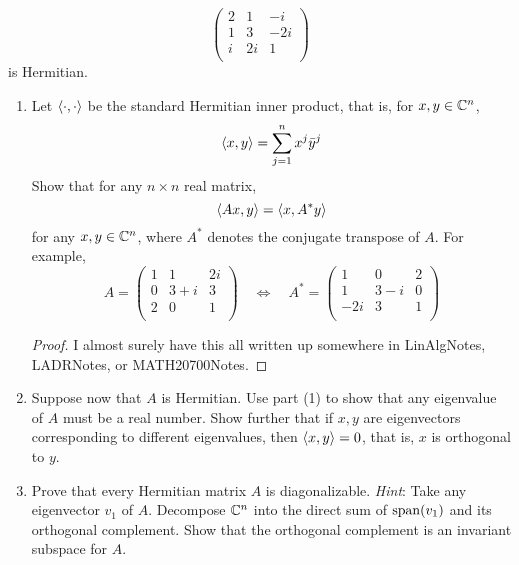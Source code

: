 \documentclass[../psets.tex]{subfiles}
\begin{document}
\begin{enumerate}
    \begin{equation*}
        \begin{pmatrix}
            2 & 1 & -i\\
            1 & 3 & -2i\\
            i & 2i & 1\\
        \end{pmatrix}
    \end{equation*}
    is Hermitian.
    \begin{enumerate}
        \item Let $\left\langle{\cdot},{\cdot}\right\rangle$ be the standard Hermitian inner product, that is, for $x,y\in\mathbb{C}^n$,
        \begin{equation*}
            \left\langle{x},{y}\right\rangle = \sum_{j=1}^nx^j\bar{y}^j
        \end{equation*}
        Show that for any $n\times n$ real matrix,
        \begin{equation*}
            \left\langle{Ax},{y}\right\rangle = \left\langle{x},{A^*y}\right\rangle
        \end{equation*}
        for any $x,y\in\mathbb{C}^n$, where $A^*$ denotes the conjugate transpose of $A$. For example,
        \begin{equation*}
            A =
            \begin{pmatrix}
                1 & 1 & 2i\\
                0 & 3+i & 3\\
                2 & 0 & 1\\
            \end{pmatrix}
            \quad\Longleftrightarrow\quad
            A^* =
            \begin{pmatrix}
                1 & 0 & 2\\
                1 & 3-i & 0\\
                -2i & 3 & 1\\
            \end{pmatrix}
        \end{equation*}
        \begin{proof}
            I almost surely have this all written up somewhere in LinAlgNotes, LADRNotes, or MATH20700Notes.
        \end{proof}
        \item Suppose now that $A$ is Hermitian. Use part (1) to show that any eigenvalue of $A$ must be a real number. Show further that if $x,y$ are eigenvectors corresponding to different eigenvalues, then $\left\langle{x},{y}\right\rangle=0$, that is, $x$ is orthogonal to $y$.
        \item Prove that every Hermitian matrix $A$ is diagonalizable. \emph{Hint}: Take any eigenvector $v_1$ of $A$. Decompose $\mathbb{C}^n$ into the direct sum of $\operatorname{span}(v_1)$ and its orthogonal complement. Show that the orthogonal complement is an invariant subspace for $A$.
    \end{enumerate}
\end{enumerate}
\end{document}
